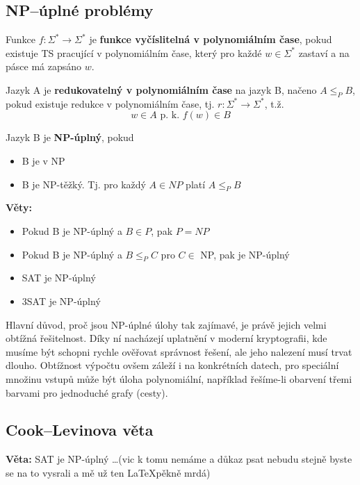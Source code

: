 \documentclass[10pt,a4paper]{article}
\theoremstyle{note}
\begin{document}
	\subsection{NP--úplné problémy}

		Funkce $f :  \Sigma^{*} \rightarrow \Sigma^{*}$ je \textbf{funkce vyčíslitelná v polynomiálním čase}, pokud existuje TS
		pracující v polynomiálním čase, který pro každé $w \in  \Sigma^{*}$ zastaví a na pásce má zapsáno $w$.

		Jazyk A je \textbf{redukovatelný v polynomiálním čase} na jazyk B, načeno $A \leq_P B$, pokud existuje redukce
		v polynomiálním čase, tj. $r :  \Sigma^{*} \rightarrow \Sigma^{*}$, t.ž. $$w \in A \text{ p. k. } f(w) \in B$$

		\vspace{3mm}
		Jazyk B je \textbf{NP-úplný}, pokud
		\begin{itemize}
			\item B je v NP
			\item B je NP-těžký. Tj. pro každý $A\in NP$ platí $A\leq_P B$
		\end{itemize}

		\vspace{3mm}
		\textbf{Věty:}
		\begin{itemize}
			\item Pokud B je NP-úplný a $B \in P$, pak $P = NP$
			\item Pokud B je NP-úplný a $B \leq_P C$ pro $C \in $ NP, pak je NP-úplný
			\item SAT je NP-úplný
			\item 3SAT je NP-úplný
		\end{itemize}

		Hlavní důvod, proč jsou NP-úplné úlohy tak zajímavé, je právě jejich velmi obtížná řešitelnost. Díky ní nacházejí uplatnění v
 		moderní kryptografii, kde musíme být schopni rychle ověřovat správnost řešení, ale jeho nalezení musí trvat dlouho. Obtížnost
		výpočtu ovšem záleží i na konkrétních datech, pro speciální množinu vstupů může být úloha polynomiální, například řešíme-li
		obarvení třemi barvami pro jednoduché grafy (cesty).



	\subsection{Cook--Levinova věta}
		\textbf{Věta:} SAT je NP-úplný \dots (vic k tomu nemáme a důkaz psat nebudu stejně byste
			 se na to vysrali a mě už ten \LaTeX  pěkně mrdá)
\end{document}
